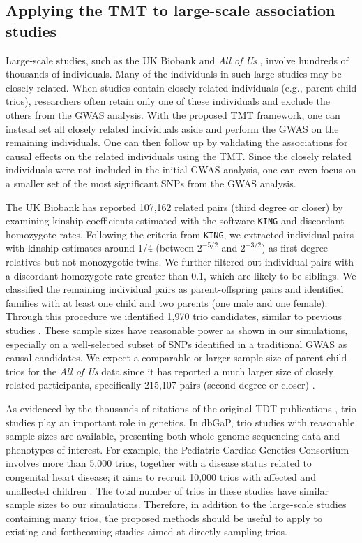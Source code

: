 \documentclass[12pt]{extarticle}
\begin{document}
{\subsection{Applying the TMT to large-scale association studies} \label{sec:biobank}

Large-scale studies, such as the UK Biobank \citep{bycroft2018} and \textit{All of Us} \citep{allofus2024}, involve hundreds of thousands of individuals. Many of the individuals in such large studies may be closely related. When studies contain closely related individuals (e.g., parent-child trios), researchers often retain only one of these individuals and exclude the others from the GWAS analysis. With the proposed TMT framework, one can instead set all closely related individuals aside and perform the GWAS on the remaining individuals. One can then follow up by validating the associations for causal effects on the related individuals using the TMT. Since the closely related individuals were not included in the initial GWAS analysis, one can even focus on a smaller set of the most significant SNPs from the GWAS analysis.

The UK Biobank has reported 107,162 related pairs (third degree or closer) \citep{bycroft2018} by examining kinship coefficients estimated with the software \texttt{KING} \citep{manichaikul2010} and discordant homozygote rates. Following the criteria from \texttt{KING}, we extracted individual pairs with kinship estimates around 1/4 (between $2^{-5/2}$ and $2^{-3/2}$) as first degree relatives but not monozygotic twins. We further filtered out individual pairs with a discordant homozygote rate greater than 0.1, which are likely  to be siblings. We classified the remaining individual pairs as parent-offspring pairs and identified families with at least one child and two parents (one male and one female). Through this procedure we identified 1,970 trio candidates, similar to previous studies \citep{bycroft2018,browning2022}. These sample sizes have reasonable power as shown in our simulations, especially on a well-selected subset of SNPs identified in a traditional GWAS as causal candidates. We expect a comparable or larger sample size of parent-child trios for the \textit{All of Us} data since it has reported a much larger size of closely related participants, specifically 215,107 pairs (second degree or closer) \citep{allofus2024}. 

As evidenced by the thousands of citations of the original TDT publications \cite{terwilliger1992, spielman1993, ewens1995}, trio studies play an important role in genetics. In dbGaP, trio studies with reasonable sample sizes are available, presenting both whole-genome sequencing data and phenotypes of interest. For example, the Pediatric Cardiac Genetics Consortium involves more than 5,000 trios, together with a disease status related to congenital heart disease; it aims to recruit 10,000 trios with affected and unaffected children \citep{pcgc2013, jin2017}. The total number of trios in these studies have similar sample sizes to our simulations. Therefore, in addition to the large-scale studies containing many trios, the proposed methods should be useful to apply to existing and forthcoming studies aimed at directly sampling trios.

}
\end{document}

